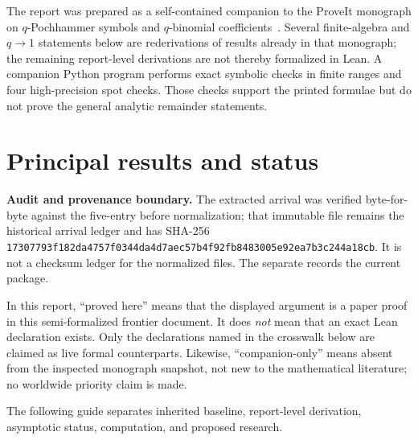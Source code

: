 \documentclass[11pt,oneside]{article}
\theoremstyle{definition}
\theoremstyle{remark}
\let\reporttopsection\section
\let\reportsubsection\subsection
\let\chapter\reporttopsection
\let\section\reportsubsection
\begin{document}
The report was prepared as a self-contained companion to the ProveIt monograph
on $q$-Pochhammer symbols and $q$-binomial
coefficients~\cite{ReshetnikovMonograph}.  Several finite-algebra and
$q\to1$ statements below are rederivations of results already in that
monograph; the remaining report-level derivations are not thereby formalized
in Lean.  A companion Python program performs exact symbolic checks in finite
ranges and four high-precision spot checks.  Those checks support the printed
formulae but do not prove the general analytic remainder statements.

\chapter*{Principal results and status}
\begin{boxedremark}
\textbf{Audit and provenance boundary.}
The extracted arrival was verified byte-for-byte against the five-entry
 before normalization; that immutable file remains the
historical arrival ledger and has SHA-256
\texttt{17307793f182da4757f0344da4d7aec57b4f92fb8483005e92ea7b3c244a18cb}.
It is not a checksum ledger for the normalized files.  The separate
 records the current package.

In this report, ``proved here'' means that the displayed argument is a paper
proof in this semi-formalized frontier document.  It does \emph{not} mean that
an exact Lean declaration exists.  Only the declarations named in the
crosswalk below are claimed as live formal counterparts.  Likewise,
``companion-only'' means absent from the inspected monograph snapshot, not new
to the mathematical literature; no worldwide priority claim is made.
\end{boxedremark}

The following guide separates inherited baseline, report-level derivation,
asymptotic status, computation, and proposed research.
\end{document}

